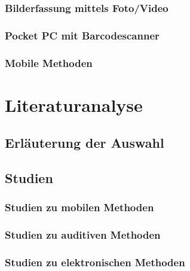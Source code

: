 \subsubsection{Bilderfassung mittels Foto/Video}

\subsubsection{Pocket PC mit Barcodescanner}

\subsubsection{Mobile Methoden}

\section{Literaturanalyse}

\subsection{Erläuterung der Auswahl}

\subsection{Studien}
\subsubsection{Studien zu mobilen Methoden}
\subsubsection{Studien zu auditiven Methoden}
\subsubsection{Studien zu elektronischen Methoden}




